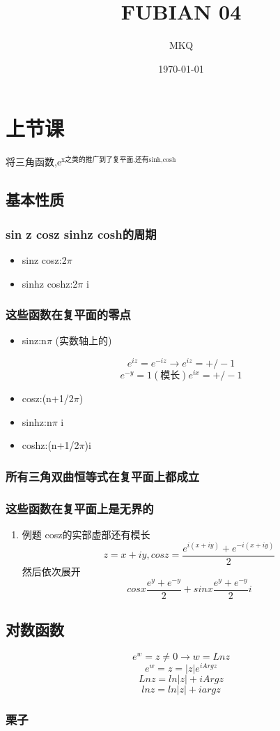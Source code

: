 \documentclass[11pt]{article}
\author{MKQ}
\date{\today}
\title{FUBIAN 04}
\begin{document}
\maketitle
\tableofcontents

\section{上节课}
\label{sec:org1e024bb}
将三角函数,e\(^{\text{x之类的推广到了复平面,还有sinh,cosh}}\)
\subsection{基本性质}
\label{sec:org6645d00}
\subsubsection{sin z cosz sinhz cosh的周期}
\label{sec:orgb3a7d72}
\begin{itemize}
\item sinz cosz:2\(\pi\)
\item sinhz coshz:2\(\pi\) i
\end{itemize}
\subsubsection{这些函数在复平面的零点}
\label{sec:orged11124}
\begin{itemize}
\item sinz:n\(\pi\) (实数轴上的)
\end{itemize}
\[
e^{iz}=e^{-iz} \rightarrow e^{iz}=+/- 1
\]
\[
e^{-y}=1(模长) e^{ix}=+/-1
\]
\begin{itemize}
\item cosz:(n+1/2\(\pi\))
\item sinhz:n\(\pi\) i
\item coshz:(n+1/2\(\pi\))i
\end{itemize}
\subsubsection{所有三角双曲恒等式在复平面上都成立}
\label{sec:org15560c2}
\subsubsection{这些函数在复平面上是无界的}
\label{sec:orgfb3ef5c}
\begin{enumerate}
\item 例题
\label{sec:orgc1f8971}
cosz的实部虚部还有模长
\[
z=x+iy,cosz=\frac{e^{i(x+iy)}+e^{-i(x+iy)}}{2}
\]
然后依次展开
\[
cosx\frac{e^y +e^{-y}}{2}+sinx\frac{e^y +e^{-y}}{2}i
\]
\end{enumerate}
\subsection{对数函数}
\label{sec:orgf260501}
\[
e^w =z \neq 0 \rightarrow w=Ln z
\]
\[
e^w =z=|z|e^{iArgz}
\]
\[
Ln z=ln|z|+iArgz
\]
\[
ln z=ln|z|+iargz
\]
\subsubsection{栗子}
\label{sec:org8ae44fa}
\end{document}
